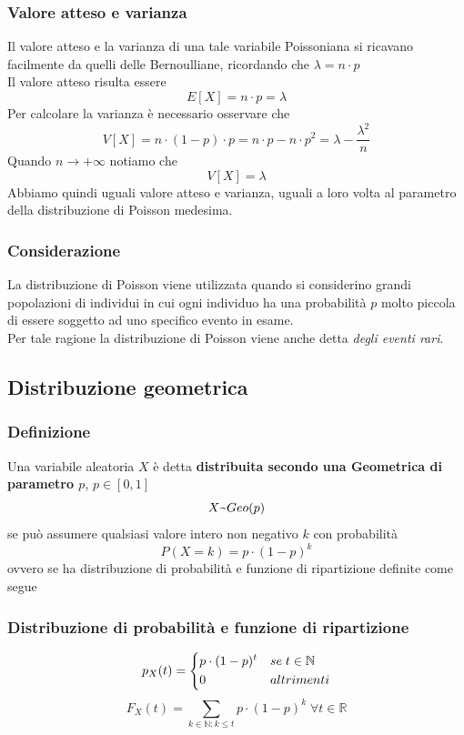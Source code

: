 \subsubsection{Valore atteso e varianza}
Il valore atteso e la varianza di una tale variabile Poissoniana si ricavano facilmente da quelli delle Bernoulliane, ricordando che $\lambda = n \cdot p$\\
Il valore atteso risulta essere 
\begin{equation}
	E[X] = n \cdot p = \lambda
\end{equation}
Per calcolare la varianza è necessario osservare che 
\begin{equation}
V[X] = n \cdot (1 - p) \cdot p = n \cdot p - n \cdot p^2 = \lambda - \frac{\lambda^2}{n} 
\end{equation}
Quando $n \to +\infty$ notiamo che 
\begin{equation}
V[X] = \lambda
\end{equation}
Abbiamo quindi uguali valore atteso e varianza, uguali a loro volta al parametro della distribuzione di Poisson medesima.
\subsubsection{Considerazione}
La distribuzione di Poisson viene utilizzata quando si considerino grandi popolazioni di individui in cui ogni individuo ha una probabilità $p$ molto piccola di essere soggetto ad uno specifico evento in esame. \\
Per tale ragione la distribuzione di Poisson viene anche detta \textit{degli eventi rari}.

\subsection{Distribuzione geometrica}
\subsubsection{Definizione}
Una variabile aleatoria $X$ è detta \textbf{distribuita secondo una Geometrica di parametro $p$}, $p \in [0,1]$
\[
X \textapprox Geo(p)
\]
se può assumere qualsiasi valore intero non negativo $k$ con probabilità 
\[
P(X = k) = p \cdot (1-p)^k
\]
ovvero se ha distribuzione di probabilità e funzione di ripartizione definite come segue

\subsubsection{Distribuzione di probabilità e funzione di ripartizione}
\begin{equation}
	p_X(t) = 
	\begin{dcases}
		p \cdot (1-p)^t & se \; t \in \mathbb{N} \\
		0 & altrimenti 
	\end{dcases}
\end{equation}
\begin{equation}
F_X(t) = \sum_{k \in \mathbb{N}: k \le t} p \cdot (1 - p)^k \; \forall t \in \mathbb{R}
\end{equation}

